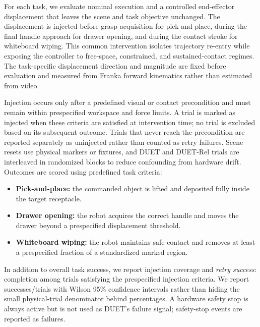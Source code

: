 \documentclass[letterpaper, 10 pt, conference]{ieeeconf}
\begin{document}


For each task, we evaluate nominal execution and a controlled end-effector displacement that leaves the scene and task objective unchanged. The displacement is injected before grasp acquisition for pick-and-place, during the final handle approach for drawer opening, and during the contact stroke for whiteboard wiping. This common intervention isolates trajectory re-entry while exposing the controller to free-space, constrained, and sustained-contact regimes. The task-specific displacement direction and magnitude are fixed before evaluation and measured from Franka forward kinematics rather than estimated from video.

Injection occurs only after a predefined visual or contact precondition and must remain within prespecified workspace and force limits. A trial is marked as injected when these criteria are satisfied at intervention time; no trial is excluded based on its subsequent outcome. Trials that never reach the precondition are reported separately as uninjected rather than counted as retry failures. Scene resets use physical markers or fixtures, and DUET and DUET-Rel trials are interleaved in randomized blocks to reduce confounding from hardware drift. Outcomes are scored using predefined task criteria:
\begin{itemize}
    \item \textbf{Pick-and-place:} the commanded object is lifted and deposited fully inside the target receptacle.
    \item \textbf{Drawer opening:} the robot acquires the correct handle and moves the drawer beyond a prespecified displacement threshold.
    \item \textbf{Whiteboard wiping:} the robot maintains safe contact and removes at least a prespecified fraction of a standardized marked region.
\end{itemize}
In addition to overall task success, we report injection coverage and \emph{retry success}: completion among trials satisfying the prespecified injection criteria. We report successes/trials with Wilson 95\% confidence intervals rather than hiding the small physical-trial denominator behind percentages. A hardware safety stop is always active but is not used as DUET's failure signal; safety-stop events are reported as failures.
\end{document}
